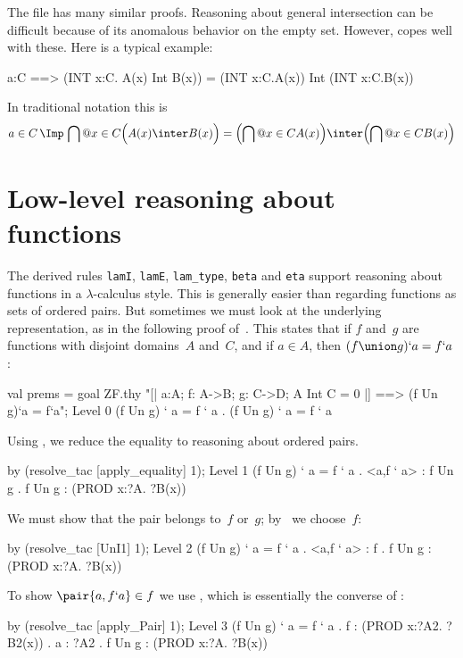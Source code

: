 The file  has many similar proofs.
Reasoning about general intersection can be difficult because of its anomalous
behavior on the empty set.  However,  copes well with
these.  Here is a typical example:
\begin{ttbox}
a:C ==> (INT x:C. A(x) Int B(x)) = (INT x:C.A(x)) Int (INT x:C.B(x))
\end{ttbox}
In traditional notation this is
\[ a\in C \,\Imp\, \bigcap@{x\in C} \Bigl(A(x) \inter B(x)\Bigr) =        
       \Bigl(\bigcap@{x\in C} A(x)\Bigr)  \inter  
       \Bigl(\bigcap@{x\in C} B(x)\Bigr)  \]

\section{Low-level reasoning about functions}
The derived rules {\tt lamI}, {\tt lamE}, {\tt lam_type}, {\tt beta}
and {\tt eta} support reasoning about functions in a
$\lambda$-calculus style.  This is generally easier than regarding
functions as sets of ordered pairs.  But sometimes we must look at the
underlying representation, as in the following proof
of~.  This states that if $f$ and~$g$ are
functions with disjoint domains~$A$ and~$C$, and if $a\in A$, then
$(f\union g)`a = f`a$:
\begin{ttbox}
val prems = goal ZF.thy
    "[| a:A;  f: A->B;  g: C->D;  A Int C = 0 |] ==>  \ttback
\ttback    (f Un g)`a = f`a";
{\out Level 0}
{\out (f Un g) ` a = f ` a}
{. (f Un g) ` a = f ` a}
\end{ttbox}
Using , we reduce the equality to reasoning about
ordered pairs.
\begin{ttbox}
by (resolve_tac [apply_equality] 1);
{\out Level 1}
{\out (f Un g) ` a = f ` a}
{. <a,f ` a> : f Un g}
{. f Un g : (PROD x:?A. ?B(x))}
\end{ttbox}
We must show that the pair belongs to~$f$ or~$g$; by~ we
choose~$f$:
\begin{ttbox}
by (resolve_tac [UnI1] 1);
{\out Level 2}
{\out (f Un g) ` a = f ` a}
{. <a,f ` a> : f}
{. f Un g : (PROD x:?A. ?B(x))}
\end{ttbox}
To show $\pair{a,f`a}\in f$ we use , which is
essentially the converse of :
\begin{ttbox}
by (resolve_tac [apply_Pair] 1);
{\out Level 3}
{\out (f Un g) ` a = f ` a}
{. f : (PROD x:?A2. ?B2(x))}
{. a : ?A2}
{. f Un g : (PROD x:?A. ?B(x))}
\end{ttbox}
